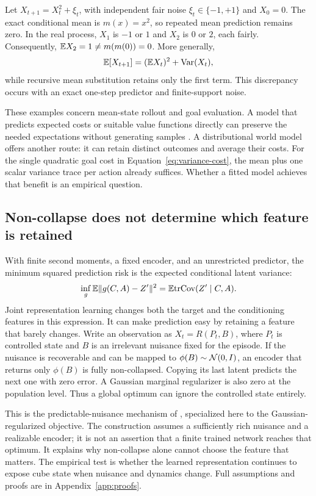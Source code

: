 Let $X_{t+1}=X_t^2+\xi_t$, with independent fair noise $\xi_t\in\{-1,+1\}$ and $X_0=0$.
The exact conditional mean is $m(x)=x^2$, so repeated mean prediction remains zero. In the real
process, $X_1$ is $-1$ or $1$ and $X_2$ is $0$ or $2$, each fairly. Consequently,
$\mathbb{E} X_2=1\ne m(m(0))=0$. More generally,
\begin{equation}
\label{eq:mean-recursion}
\mathbb{E}[X_{t+1}]=(\mathbb{E} X_t)^2+\mathrm{Var}(X_t),
\end{equation}
while recursive mean substitution retains only the first term. This discrepancy occurs with an
exact one-step predictor and finite-support noise.

These examples concern mean-state rollout and goal evaluation. A model that predicts expected
costs or suitable value functions directly can preserve the needed expectations without generating
samples \citep{wan2019expectation,grimm2021proper}. A distributional world model offers another route:
it can retain distinct outcomes and average their costs. For the single quadratic goal cost in
Equation~\ref{eq:variance-cost}, the mean plus one scalar variance trace per action already suffices. Whether a fitted model achieves that
benefit is an empirical question.

\subsection{Non-collapse does not determine which feature is retained}
\label{sec:nuisance-example}

With finite second moments, a fixed encoder, and an unrestricted predictor, the minimum squared prediction risk is the expected
conditional latent variance:
\[
\inf_g\mathbb{E}\|g(C,A)-Z'\|^2=\mathbb{E}\mathrm{tr}\mathrm{Cov}(Z'\mid C,A).
\]
Joint representation learning changes both the target and the conditioning features in this
expression. It can make prediction easy by retaining a feature that barely changes.
Write an observation as $X_t=R(P_t,B)$,
where $P_t$ is controlled state and $B$ is an irrelevant nuisance fixed for the episode. If the
nuisance is recoverable and can be mapped to $\phi(B)\sim\mathcal{N}(0,I)$, an encoder that returns only
$\phi(B)$ is fully non-collapsed. Copying its last latent predicts the next one with zero error.
A Gaussian marginal regularizer is also zero at the population level. Thus a global optimum can
ignore the controlled state entirely.

This is the predictable-nuisance mechanism of \citet{sobal2022slow}, specialized here to the
Gaussian-regularized objective. The construction assumes a sufficiently rich nuisance and a
realizable encoder; it is not an assertion that a finite trained network reaches that optimum.
It explains why non-collapse alone cannot choose the feature that matters. The empirical test is
whether the learned representation continues to expose cube state when nuisance and dynamics change.
Full assumptions and proofs are in Appendix~\ref{app:proofs}.

